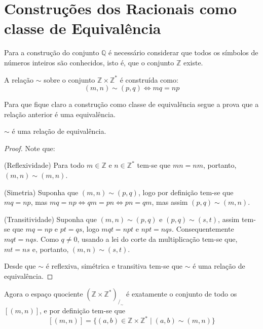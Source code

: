 \chapter{Construções dos Racionais como classe de Equivalência}\label{ape:Racionais}

Para a construção do conjunto $\mathbb{Q}$ é necessário considerar que todos os símbolos de números inteiros são conhecidos, isto é, que o conjunto $\mathbb{Z}$ existe. 

\begin{definition}
	A relação $\sim$ sobre o conjunto $\mathbb{Z} \times \mathbb{Z}^*$ é construída como:
	$$(m, n) \sim (p, q) \Longleftrightarrow mq = np$$
\end{definition}

Para que fique claro a construção como classe de equivalência segue a prova que a relação anterior é uma equivalência.

\begin{lemma}
	$\sim$ é uma relação de equivalência.
\end{lemma}

\begin{proof}
	Note que:
	
	(Reflexividade) Para todo $m \in \mathbb{Z}$ e $n \in \mathbb{Z}^*$ tem-se que $mn = nm$, portanto, $(m,n) \sim (m,n)$.
	
	(Simetria) Suponha que $(m, n) \sim (p, q)$, logo por definição tem-se que $mq = np$, mas $mq = np \Longleftrightarrow qm = pn \Longleftrightarrow pn = qm$, mas assim $(p, q) \sim (m,n)$.
	
	(Transitividade) Suponha que $(m, n) \sim (p, q)$ e $(p, q) \sim (s, t)$, assim tem-se que $mq = np$ e $pt = qs$, logo $mqt = npt$ e $npt = nqs$. Consequentemente $mqt = nqs$. Como $q \neq 0$, usando a lei do corte da multiplicação tem-se que, $mt = ns$ e, portanto, $(m,n) \sim (s, t)$.
	
	Desde que $\sim$ é reflexiva, simétrica e transitiva tem-se que $\sim$ é uma relação de equivalência.
\end{proof}

Agora o espaço quociente $(\mathbb{Z} \times \mathbb{Z}^*)_{/_\sim}$ é exatamente o conjunto de todo os $[(m,n)]$, e por definição tem-se que 
$$[(m,n)] = \{(a, b) \in \mathbb{Z} \times \mathbb{Z}^* \mid (a, b) \sim (m, n)\}$$